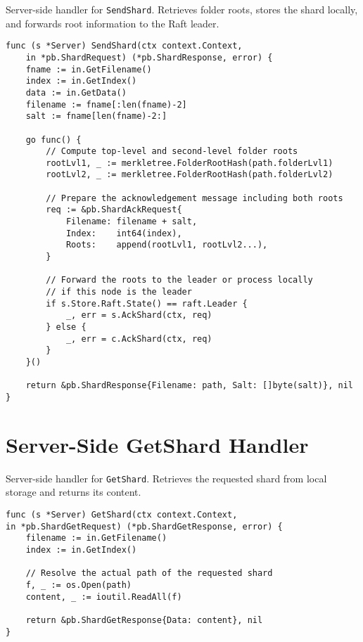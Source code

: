 \begin{listing}[H]
\caption{Server-side handler for \texttt{SendShard}. Retrieves folder roots, stores the shard locally, and forwards root information to the Raft leader.}
\begin{verbatim}
func (s *Server) SendShard(ctx context.Context,
    in *pb.ShardRequest) (*pb.ShardResponse, error) {
    fname := in.GetFilename()
    index := in.GetIndex()
    data := in.GetData()
    filename := fname[:len(fname)-2]
    salt := fname[len(fname)-2:]

    go func() {
        // Compute top-level and second-level folder roots
        rootLvl1, _ := merkletree.FolderRootHash(path.folderLvl1)
        rootLvl2, _ := merkletree.FolderRootHash(path.folderLvl2)

        // Prepare the acknowledgement message including both roots
        req := &pb.ShardAckRequest{
            Filename: filename + salt,
            Index:    int64(index),
            Roots:    append(rootLvl1, rootLvl2...),
        }

        // Forward the roots to the leader or process locally 
        // if this node is the leader
        if s.Store.Raft.State() == raft.Leader {
            _, err = s.AckShard(ctx, req)
        } else {
            _, err = c.AckShard(ctx, req)
        }
    }()

    return &pb.ShardResponse{Filename: path, Salt: []byte(salt)}, nil
}
\end{verbatim}
\end{listing}

\newpage
\section{Server-Side GetShard Handler} \label{code:get-shard-server}
\begin{listing}[H]
\caption{Server-side handler for \texttt{GetShard}. Retrieves the requested shard from local storage and returns its content.}
\begin{verbatim}
func (s *Server) GetShard(ctx context.Context,
in *pb.ShardGetRequest) (*pb.ShardGetResponse, error) {
    filename := in.GetFilename()
    index := in.GetIndex()

    // Resolve the actual path of the requested shard
    f, _ := os.Open(path)
    content, _ := ioutil.ReadAll(f)

    return &pb.ShardGetResponse{Data: content}, nil
}
\end{verbatim}
\end{listing}



